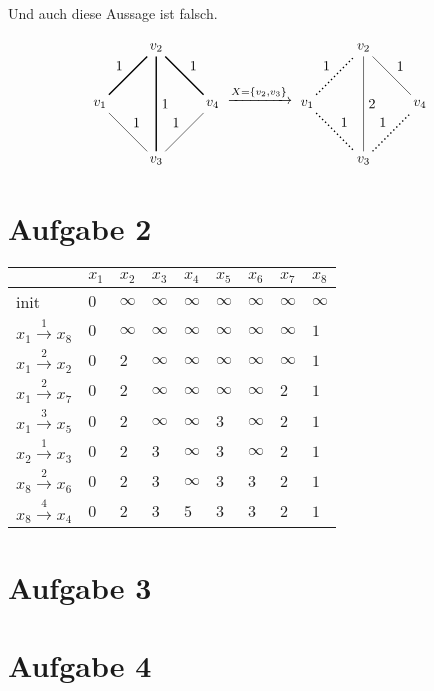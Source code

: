 \documentclass[a4paper]{article}
\begin{document}
\subsection{}
Und auch diese Aussage ist falsch.

\[
\begin{tikzpicture}[auto, node distance=2cm, baseline=0ex]
	\node (v1) {$v_1$};
	\node (v2) [above right of=v1] {$v_2$};
	\node (v3) [below right of=v1] {$v_3$};
	\node (v4) [below right of=v2] {$v_4$};
	\path
		(v1) edge [line width=1pt] node {1} (v2)
		(v1) edge node {1} (v3)
		(v2) edge [line width=1pt] node {1} (v3)
		(v2) edge [line width=1pt] node {1} (v4)
		(v3) edge node {1} (v4)
	;
\end{tikzpicture}
\xrightarrow{X = \{v_2, v_3\}}
\begin{tikzpicture}[auto, node distance=2cm, baseline=0ex]
	\node (v1) {$v_1$};
	\node (v2) [above right of=v1] {$v_2$};
	\node (v3) [below right of=v1] {$v_3$};
	\node (v4) [below right of=v2] {$v_4$};
	\path
		(v1) edge [line width=1pt, dotted] node {1} (v2)
		(v1) edge [line width=1pt, dotted] node {1} (v3)
		(v2) edge node {2} (v3)
		(v2) edge node {1} (v4)
		(v3) edge [line width=1pt, dotted] node {1} (v4)
	;
\end{tikzpicture}
\]

\section{Aufgabe 2}

\begin{tabular}{l|l|l|l|l|l|l|l|l}
	& $x_1$ & $x_2$ & $x_3$ & $x_4$ & $x_5$ & $x_6$ & $x_7$ & $x_8$ \\
\hline
init	& $0$ & $\infty$ & $\infty$ & $\infty$ & $\infty$ & $\infty$ & $\infty$ & $\infty$ \\
\hline
$x_1 \xrightarrow{1} x_8$	& $0$ & $\infty$ & $\infty$ & $\infty$ & $\infty$ & $\infty$ & $\infty$ & $1$ \\
\hline
$x_1 \xrightarrow{2} x_2$	& $0$ & $2$ & $\infty$ & $\infty$ & $\infty$ & $\infty$ & $\infty$ & $1$ \\
\hline
$x_1 \xrightarrow{2} x_7$	& $0$ & $2$ & $\infty$ & $\infty$ & $\infty$ & $\infty$ & $2$ & $1$ \\
\hline
$x_1 \xrightarrow{3} x_5$	& $0$ & $2$ & $\infty$ & $\infty$ & $3$ & $\infty$ & $2$ & $1$ \\
\hline
$x_2 \xrightarrow{1} x_3$	& $0$ & $2$ & $3$ & $\infty$ & $3$ & $\infty$ & $2$ & $1$ \\
\hline
$x_8 \xrightarrow{2} x_6$	& $0$ & $2$ & $3$ & $\infty$ & $3$ & $3$ & $2$ & $1$ \\
\hline
$x_8 \xrightarrow{4} x_4$	& $0$ & $2$ & $3$ & $5$ & $3$ & $3$ & $2$ & $1$ \\
\hline
\end{tabular}

\section{Aufgabe 3}

\section{Aufgabe 4}
\end{document}
